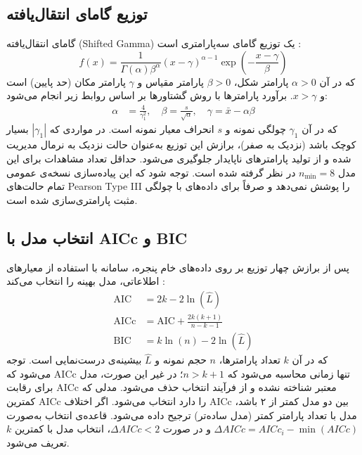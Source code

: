 \documentclass[12pt,a4paper,twocolumn]{article}
\begin{document}
\subsection{توزیع گامای انتقال‌یافته}
گامای انتقال‌یافته (Shifted Gamma) یک توزیع گامای سه‌پارامتری است \cite{hosking1990}:
\begin{equation}
f(x) = \frac{1}{\Gamma(\alpha)\beta^{\alpha}}(x-\gamma)^{\alpha-1}\exp\left(-\frac{x-\gamma}{\beta}\right)
\end{equation}
که در آن $\alpha>0$ پارامتر شکل، $\beta>0$ پارامتر مقیاس و $\gamma$ پارامتر مکان (حد پایین) است و $x>\gamma$. برآورد پارامترها با روش گشتاورها بر اساس روابط زیر انجام می‌شود:
\begin{align}
\alpha &= \frac{4}{\gamma_1^2}, \quad \beta = \frac{s}{\sqrt{\alpha}}, \quad \gamma = \bar{x} - \alpha\beta
\end{align}
که در آن $\gamma_1$ چولگی نمونه و $s$ انحراف معیار نمونه است. در مواردی که $|\gamma_1|$ بسیار کوچک باشد (نزدیک به صفر)، برازش این توزیع به‌عنوان حالت نزدیک به نرمال مدیریت شده و از تولید پارامترهای ناپایدار جلوگیری می‌شود. حداقل تعداد مشاهدات برای این مدل $n_{\min}=8$ در نظر گرفته شده است. توجه شود که این پیاده‌سازی نسخه‌ی عمومی تمام حالت‌های Pearson Type III را پوشش نمی‌دهد و صرفاً برای داده‌های با چولگی مثبت پارامتری‌سازی شده است.

\subsection{انتخاب مدل با AICc و BIC}
پس از برازش چهار توزیع بر روی داده‌های خام پنجره، سامانه با استفاده از معیارهای اطلاعاتی، مدل بهینه را انتخاب می‌کند \cite{burnham2002}:
\begin{align}
\text{AIC} &= 2k - 2\ln(\hat{L}) \\
\text{AICc} &= \text{AIC} + \frac{2k(k+1)}{n-k-1} \\
\text{BIC} &= k\ln(n) - 2\ln(\hat{L})
\end{align}
که در آن $k$ تعداد پارامترها، $n$ حجم نمونه و $\hat{L}$ بیشینه‌ی درست‌نمایی است. توجه می‌شود که AICc تنها زمانی محاسبه می‌شود که $n > k+1$؛ در غیر این صورت، مدل برای رقابت AICc معتبر شناخته نشده و از فرآیند انتخاب حذف می‌شود. مدلی که کمترین AICc را دارد انتخاب می‌شود. اگر اختلاف AICc بین دو مدل کمتر از ۲ باشد، مدل با تعداد پارامتر کمتر (مدل ساده‌تر) ترجیح داده می‌شود. قاعده‌ی انتخاب به‌صورت $\Delta AICc = AICc_i - \min(AICc)$ و در صورت $\Delta AICc < 2$، انتخاب مدل با کمترین $k$ تعریف می‌شود.
\end{document}
